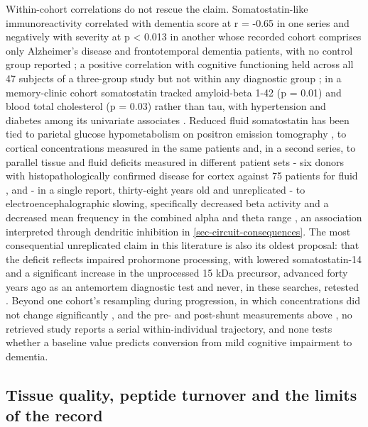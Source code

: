 \documentclass[11pt]{article}
\begin{document}
Within-cohort correlations do not rescue the claim. Somatostatin-like immunoreactivity correlated with dementia score at r = -0.65 in one series \citep{Strittmatter1997} and negatively with severity at p < 0.013 in another whose recorded cohort comprises only Alzheimer's disease and frontotemporal dementia patients, with no control group reported \citep{Minthon1997}; a positive correlation with cognitive functioning held across all 47 subjects of a three-group study but not within any diagnostic group \citep{Sunderland1987}; in a memory-clinic cohort somatostatin tracked amyloid-beta 1-42 (p = 0.01) and blood total cholesterol (p = 0.03) rather than tau, with hypertension and diabetes among its univariate associates \citep{Duron2018}. Reduced fluid somatostatin has been tied to parietal glucose hypometabolism on positron emission tomography \citep{Tamminga1987}, to cortical concentrations measured in the same patients \citep{Gomez1986b} and, in a second series, to parallel tissue and fluid deficits measured in different patient sets - six donors with histopathologically confirmed disease for cortex against 75 patients for fluid \citep{Reinikainen1987}, and - in a single report, thirty-eight years old and unreplicated - to electroencephalographic slowing, specifically decreased beta activity and a decreased mean frequency in the combined alpha and theta range \citep{Soininen1988}, an association interpreted through dendritic inhibition in \ref{sec-circuit-consequences}. The most consequential unreplicated claim in this literature is also its oldest proposal: that the deficit reflects impaired prohormone processing, with lowered somatostatin-14 and a significant increase in the unprocessed 15 kDa precursor, advanced forty years ago as an antemortem diagnostic test and never, in these searches, retested \citep{Gomez1986a}. Beyond one cohort's resampling during progression, in which concentrations did not change significantly \citep{Atack1988}, and the pre- and post-shunt measurements above \citep{Poca2001}, no retrieved study reports a serial within-individual trajectory, and none tests whether a baseline value predicts conversion from mild cognitive impairment to dementia.

\subsection{Tissue quality, peptide turnover and the limits of the record}
\label{sec-09-tissue-quality}
\end{document}
